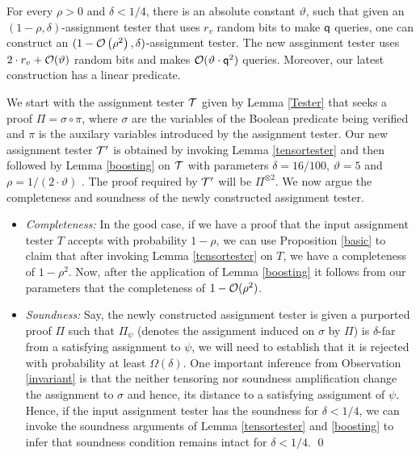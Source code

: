 \begin{corollary}\label{iterate}
  For every $\rho > 0$ and $\delta < 1/4$, there is an absolute
  constant $\vartheta$, such that given an $(1 - \rho,
  \delta)$-assignment tester that uses $r_v$ random bits to make ${\sf q}$
  queries, one can construct an $(1 - {\cal O}\left(\rho^2\right) ,
  {\delta})$-assignment tester. The new assginment tester uses $2
  \cdot r_v + {\cal O}(\vartheta)$ random bits and makes ${\cal
    O}(\vartheta \cdot {\sf q}^2)$ queries. Moreover, our latest
  construction has a linear predicate.
\end{corollary}
 We start with the assignment tester ${\cal T}$
given by Lemma \ref{Tester} that seeks a proof $\Pi = \sigma \circ
\pi$, where $\sigma$ are the variables of the Boolean predicate being
verified and $\pi$ is the auxilary variables introduced by the
assignment tester. Our new assignment tester ${\cal T}'$ is obtained
by invoking Lemma \ref{tensortester} and then followed by Lemma
\ref{boosting} on ${\cal T}$ with parameters $\delta = 16/100$,
$\vartheta = 5$ and $\rho = 1/\left(2 \cdot \vartheta\right)$ . The
proof required by ${\cal T}'$ will be $\Pi^{\otimes 2}$. We now argue
the completeness and soundness of the newly constructed assignment
tester.
\begin{itemize}
\item {\em Completeness:} In the good case, if we have a proof that
  the input assignment tester $T$ accepts with probability $1 - \rho$,
  we can use Proposition \ref{basic} to claim that after invoking
  Lemma \ref{tensortester} on $T$, we have a completeness of $1-
  \rho^2$. Now, after the application of Lemma \ref{boosting} it
  follows from our parameters that the completeness of $1 - {\cal
    O}(\rho^2)$.
\item {\em Soundness:} Say, the newly constructed assignment tester is
  given a purported proof $\Pi$ such that $\Pi_\psi$ (denotes the
  assignment induced on $\sigma$ by $\Pi$) is $\delta$-far from a
  satisfying assignment to $\psi$, we will need to establish that it
  is rejected with probability at least $\Omega(\delta)$. One
  important inference from Observation \ref{invariant} is that the
  neither tensoring nor soundness amplification change the assignment
  to $\sigma$ and hence, its distance to a satisfying assignment of
  $\psi$. Hence, if the input assignment tester has the soundness for
  $\delta < 1/4$, we can invoke the soundness arguments of Lemma
  \ref{tensortester} and \ref{boosting} to infer that soundness
  condition remains intact for $\delta < 1/4$. \qed
\end{itemize} 


